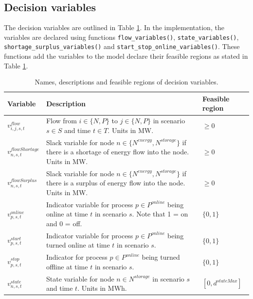 \documentclass{article}
\begin{document}
\subsection{Decision variables}

The decision variables are outlined in Table \ref{tbl:decisionvariables}. In the implementation, the variables are declared using functions \texttt{flow\_variables()}, \texttt{state\_variables()}, \texttt{shortage\_surplus\_variables()} and \texttt{start\_stop\_online\_variables()}. These functions add the variables to the model declare their feasible regions as stated in Table \ref{tbl:decisionvariables}.

\begin{table}[H]
\small
\caption{Names, descriptions and feasible regions of decision variables.}
\label{tbl:decisionvariables}
\centering
\begin{tabular}{ l  | p{7cm} |l}

Variable&   Description   & Feasible region\\
\midrule
$v^{flow}_{i,j , s, t}$ & Flow from $i \in \{N, P\}$ to $j \in \{N, P\}$ in scenario $s \in S$ and time $t \in T$. Units in MW. & $\geq0$ \\

$v^{flowShortage}_{n, s, t}$ &  Slack variable for node $n \in \{N^{energy}, N^{storage}\}$ if there is a shortage of energy flow into the node. Units in MW. & $\geq0$ \\

$v^{flowSurplus}_{n, s, t}$   & Slack variable for node $n \in \{N^{energy}, N^{storage}\}$ if there is a surplus of energy flow into the node. Units in MW. & $\geq0$ \\


$v^{online}_{p,s,t}$ & Indicator variable for process $p \in P^{online}$ being online at time $t$ in scenario $s$. Note that 1 = on and 0 = off.  & $\{0, 1\}$\\

$v^{start}_{p,s,t}$ &   Indicator variable for process $p \in P^{online}$ being turned online at time $t$ in scenario $s$. & $\{0, 1\}$\\

$v^{stop}_{p,s,t}$ &   Indicator for process $p \in P^{online}$ being turned offline at time $t$ in scenario $s$. & $\{0, 1\}$\\

$v^{state}_{n, s, t}$  & State variable for node $n \in N^{storage}$ in scenario $s$ and time $t$. Units in MWh. & $[0, d^{stateMax}]$ \\


\end{tabular}
\end{table}
\end{document}
